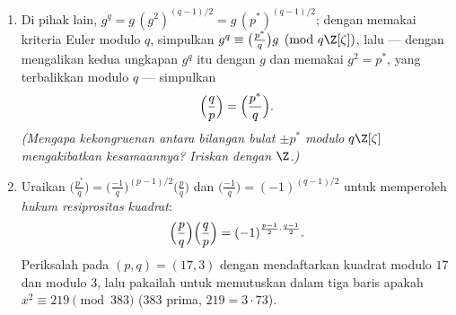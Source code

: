 \begin{problem}
\begin{enumerate}[resume]
\[        \]
        \emph{(mimpi mahasiswa baru: $(x + y)^q \equiv x^q + y^q$
        modulo $q$ di ring komutatif mana pun; lalu $g^q \equiv
        \sum_a\bigl(\frac ap\bigr)^q\zeta^{aq}$, indeks ulang $b =
        aq$ dan keluarkan $\bigl(\frac{q^{-1}}p\bigr) =
        \bigl(\frac qp\bigr)$)}.
  \item Di pihak lain, $g^q = g\,(g^2)^{(q-1)/2} =
        g\,(p^*)^{(q-1)/2}$; dengan memakai kriteria Euler modulo $q$,
        simpulkan $g^q \equiv \bigl(\frac{p^*}q\bigr)g
        \pmod{q\Z[\zeta]}$, lalu --- dengan mengalikan kedua
        ungkapan $g^q$ itu dengan $g$ dan memakai $g^2 = p^*$,
        yang terbalikkan modulo $q$ --- simpulkan
        \[
        \Bigl(\frac qp\Bigr) = \Bigl(\frac{p^*}q\Bigr) .
        \]
        \emph{(Mengapa kekongruenan antara bilangan bulat
        $\pm p^*$ modulo $q\Z[\zeta]$ mengakibatkan kesamaannya?
        Iriskan dengan $\Z$.)}
  \item Uraikan $\bigl(\frac{p^*}q\bigr) =
        \bigl(\frac{-1}q\bigr)^{(p-1)/2}\bigl(\frac pq\bigr)$
        dan $\bigl(\frac{-1}q\bigr) = (-1)^{(q-1)/2}$ untuk
        memperoleh \emph{hukum resiprositas kuadrat}:
        \[
        \Bigl(\frac pq\Bigr)\Bigl(\frac qp\Bigr)
        = (-1)^{\frac{p-1}2\cdot\frac{q-1}2} .
        \]
        Periksalah pada $(p, q) = (17, 3)$ dengan mendaftarkan kuadrat
        modulo $17$ dan modulo $3$, lalu pakailah untuk memutuskan dalam tiga
        baris apakah $x^2 \equiv 219 \pmod{383}$ 
        ($383$ prima, $219 = 3\cdot73$).
\end{enumerate}


\end{problem}
